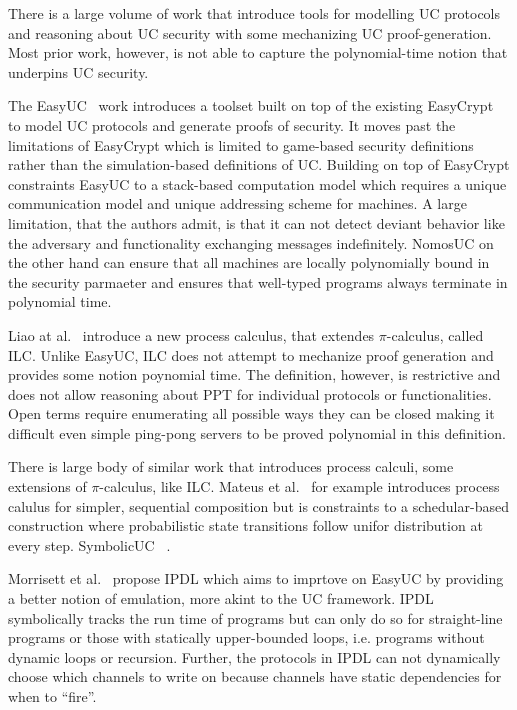 There is a large volume of work that introduce tools for modelling UC protocols and reasoning about UC security with some mechanizing UC proof-generation.
Most prior work, however, is not able to capture the polynomial-time notion that underpins UC security.

The EasyUC~\cite{easyuc} work introduces a toolset built on top of the existing EasyCrypt~\cite{easycrypt} to model UC protocols and generate proofs of security.
It moves past the limitations of EasyCrypt which is limited to game-based security definitions rather than the simulation-based definitions of UC.
Building on top of EasyCrypt constraints EasyUC to a stack-based computation model which requires a unique communication model and unique addressing scheme for machines.
A large limitation, that the authors admit, is that it can not detect deviant behavior like the adversary and functionality exchanging messages indefinitely.
NomosUC on the other hand can ensure that all machines are locally polynomially bound in the security parmaeter and ensures that well-typed programs always terminate in polynomial time.

Liao at al.~\cite{ilc} introduce a new process calculus, that extendes $\pi$-calculus, called ILC.
Unlike EasyUC, ILC does not attempt to mechanize proof generation and provides some notion poynomial time.
The definition, however, is restrictive and does not allow reasoning about PPT for individual protocols or functionalities.
Open terms require enumerating all possible ways they can be closed making it difficult even simple ping-pong servers to be proved polynomial in this definition.

There is large body of similar work that introduces process calculi, some extensions of $\pi$-calculus, like ILC.
Mateus et al.~\cite{mateus} for example introduces process calulus for simpler, sequential composition but is constraints to a schedular-based construction where probabilistic state transitions follow unifor distribution at every step.
SymbolicUC~\cite{symbolicuc} .

Morrisett et al.~\cite{ipdl} propose IPDL which aims to imprtove on EasyUC by providing a better notion of emulation, more akint to the UC framework.
IPDL symbolically tracks the run time of programs but can only do so for straight-line programs or those with statically upper-bounded loops, i.e. programs without dynamic loops or recursion. 
Further, the protocols in IPDL can not dynamically choose which channels to write on because channels have static dependencies for when to ``fire''.

